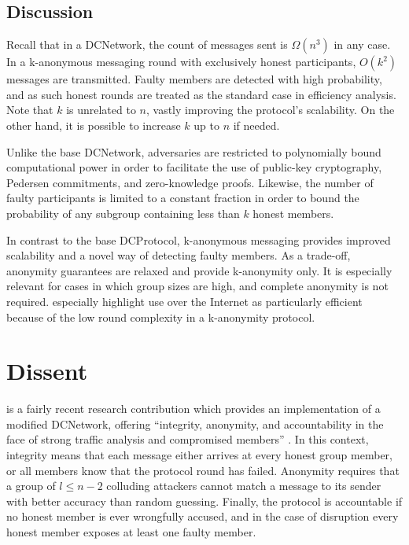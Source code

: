 \subsection{Discussion}

Recall that in a \ac{DCNetwork}, the count of messages sent is $\Omega(n^3)$ in any case.
In a k-anonymous messaging round with exclusively honest participants, $O(k^2)$ messages are transmitted.
Faulty members are detected with high probability, and as such
honest rounds are treated as the standard case in efficiency analysis.
Note that $k$ is unrelated to $n$, vastly improving the protocol's scalability.
On the other hand, it is possible to increase $k$ up to $n$ if needed.

Unlike the base \ac{DCNetwork}, adversaries are restricted to polynomially bound computational
power in order to facilitate the use of public-key cryptography, Pedersen commitments, and zero-knowledge
proofs. Likewise, the number of faulty participants is limited to a constant fraction in order
to bound the probability of any subgroup containing less than $k$ honest members.

In contrast to the base \ac{DCProtocol}, k-anonymous messaging provides improved scalability and
a novel way of detecting faulty members. As a trade-off, anonymity guarantees are relaxed
and provide k-anonymity only. It is especially relevant for cases in which group sizes are high,
and complete anonymity is not required. \citeauthor{von2003k} especially highlight use over the
Internet as particularly efficient because of the low round complexity in a k-anonymity protocol.

\section{Dissent}

\Dissent is a fairly recent research contribution which provides an implementation of a modified \ac{DCNetwork},
offering ``integrity, anonymity, and accountability in the face of strong traffic analysis and compromised members'' \cite{journals/corr/abs-1004-3057}. In this context, integrity means that each message either
arrives at every honest group member, or all members know that the protocol round has failed. Anonymity
requires that a group of $l \leq n - 2$ colluding attackers cannot match a message to its sender
with better accuracy than random guessing. Finally, the protocol is accountable if no honest member is
ever wrongfully accused, and in the case of disruption every honest member exposes at least one faulty member.

